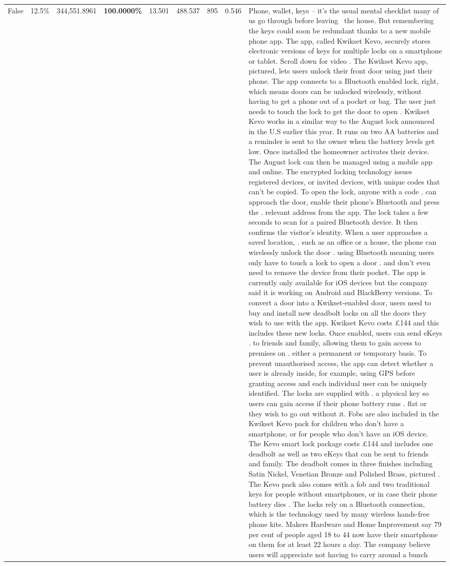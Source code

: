 \begin{table}[H]
\begin{tabular}{lllrlllll}
False & 12.5\% & 344,551.8961 & \bfseries \color{red} 100.0000\% & 13.501 & 488.537 & 895 & 0.546 & Phone, wallet, keys – it’s the usual mental checklist many of us go through before leaving  the house. But remembering the keys could soon be redundant thanks to a new mobile phone app. The app, called Kwikset Kevo, securely stores electronic versions of keys for multiple locks on a smartphone or tablet. Scroll down for video . The Kwikset Kevo app, pictured, lets users unlock their front door using just their phone. The app connects to a Bluetooth enabled lock, right, which means doors can be unlocked wirelessly, without having to get a phone out of a pocket or bag. The user just needs to touch the lock to get the door to open . Kwikset Kevo works in a similar way to the August lock announced in the U.S earlier this year. It runs on two AA batteries and a reminder is sent to the owner when the battery levels get low. Once installed the homeowner activates their device. The August lock can then be managed using a mobile app and online. The encrypted locking technology issues registered devices, or invited devices, with unique codes that can't be copied. To open the lock, anyone with a code . can approach the door, enable their phone's Bluetooth and press the . relevant address from the app. The lock takes a few seconds to scan for a paired Bluetooth device. It then confirms the visitor's identity. When a user approaches a saved location, . such as an office or a house, the phone can wirelessly unlock the door . using Bluetooth meaning users only have to touch a lock to open a door . and don't even need to remove the device from their pocket. The app is currently only available for iOS devices but the company said it is working on Android and BlackBerry versions. To convert a door into a Kwikset-enabled door, users need to buy and install new deadbolt locks on all the doors they wish to use with the app. Kwikset Kevo costs £144 and this includes these new locks. Once enabled, users can send eKeys . to friends and family, allowing them to gain access to premises on . either a permanent or temporary basis. To prevent unauthorised access, the app can detect whether a user is already inside, for example, using GPS before granting access and each individual user can be uniquely identified. The locks are supplied with . a physical key so users can gain access if their phone battery runs . flat or they wish to go out without it. Fobs are also included in the Kwikset Kevo pack for children who don't have a smartphone, or for people who don't have an iOS device. The Kevo smart lock package costs £144 and includes one deadbolt as well as two eKeys that can be sent to friends and family. The deadbolt comes in three finishes including Satin Nickel, Venetian Bronze and Polished Brass, pictured . The Kevo pack also comes with a fob and two traditional keys for people without smartphones, or in case their phone battery dies . The locks rely on a Bluetooth connection, which is the technology used by many wireless hands-free phone kits. Makers Hardware and Home Improvement say 79 per cent of people aged 18 to 44 now have their smartphone on them for at least 22 hours a day. The company believe users will appreciate not having to carry around a bunch 
\end{tabular}
\end{table}
